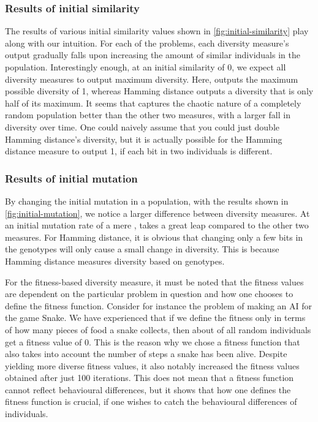\subsubsection{Results of initial similarity} The results of various initial similarity values shown in \cref{fig:initial-similarity} play along with our intuition. For each of the problems, each diversity measure's output gradually falls upon increasing the amount of similar individuals in the population. Interestingly enough, at an initial similarity of 0, we expect all diversity measures to output maximum diversity. Here, \dia{} outputs the maximum possible diversity of 1, whereas Hamming distance outputs a diversity that is only half of its maximum. It seems that \dia{} captures the chaotic nature of a completely random population better than the other two measures, with a larger fall in diversity over time. One could naively assume that you could just double Hamming distance's diversity, but it is actually possible for the Hamming distance measure to output 1, if each bit in two individuals is different.
%

%
\subsubsection{Results of initial mutation} By changing the initial mutation in a population, with the results shown in \cref{fig:initial-mutation}, we notice a larger difference between diversity measures. At an initial mutation rate of a mere , \dia{} takes a great leap compared to the other two measures. For Hamming distance, it is obvious that changing only a few bits in the genotypes will only cause a small change in diversity. This is because Hamming distance measures diversity based on genotypes.

For the fitness-based diversity measure, it must be noted that the fitness values are dependent on the particular problem in question and how one chooses to define the fitness function. Consider for instance the problem of making an AI for the game Snake. We have experienced that if we define the fitness only in terms of how many pieces of food a snake collects, then about  of all random individuals get a fitness value of 0. This is the reason why we chose a fitness function that also takes into account the number of steps a snake has been alive. Despite yielding more diverse fitness values, it also notably increased the fitness values obtained after just 100 iterations. This does not mean that a fitness function cannot reflect behavioural differences, but it shows that how one defines the fitness function is crucial, if one wishes to catch the behavioural differences of individuals.
%


